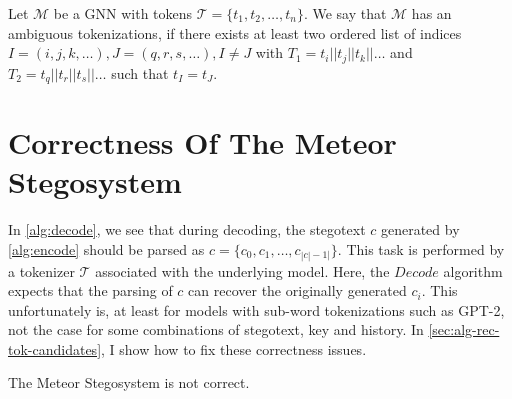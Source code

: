 \begin{definition}
	Let $\mathcal{M}$ be a GNN with tokens $\mathcal{T} = \{ t_1, t_2, \dots, t_n \}$.
	We say that $\mathcal{M}$ has an ambiguous tokenizations, if there exists at least two ordered list of indices $I = (i, j, k, \dots), J = (q, r, s, \dots), I \neq J$ with $T_1 = t_i || t_j || t_k || \dots$ and $T_2 = t_q || t_r || t_s || \dots$ such that $t_I = t_J$.
\end{definition}

\section{Correctness Of The Meteor Stegosystem}

In \autoref{alg:decode}, we see that during decoding, the stegotext $c$ generated by \autoref{alg:encode} should be parsed as $c = \{c_0,c_1, \dots, c_{|c|-1|}\}$.
This task is performed by a tokenizer $\mathcal{T}$ associated with the underlying model.
Here, the $Decode$ algorithm expects that the parsing of $c$ can recover the originally generated $c_i$.
This unfortunately is, at least for models with sub-word tokenizations such as GPT-2, not the case for some combinations of stegotext, key and history.
In \autoref{sec:alg-rec-tok-candidates}, I show how to fix these correctness issues.

\begin{theorem}
The Meteor Stegosystem is not correct.
\end{theorem}

